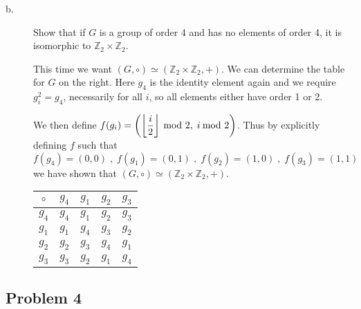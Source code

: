 \documentclass[../hw_sols.tex]{subfiles}
\begin{document}
\begin{description}
\begin{solution}
\end{solution}

\item[b.] Show that if $G$ is a group of order 4 and has no elements of order 
4, it is isomorphic to $\mathbb{Z}_2 \times \mathbb{Z}_2$.

\begin{solution}

This time we want $(G,\circ) \simeq (\mathbb{Z}_2 \times \mathbb{Z}_2, +)$. 
We can determine the table for $G$ on the right. Here $g_4$ is the identity 
element again and we require $g_i^2 = g_4$, necessarily for all $i$, so all 
elements either have order 1 or 2. 

\begin{minipage}{0.65\linewidth}
We then define 
$\displaystyle f(g_i) = 
\left( 
	\left\lfloor \frac{i}{2} \right\rfloor \tmod{2}, \; i \tmod{2} 
\right)$.
Thus by explicitly defining $f$ such that
	\[ f(g_4) = (0,0) \; , \; 
	f(g_1) = (0,1) \; , \; 
	f(g_2) = (1,0) \; , \; 
	f(g_3) = (1,1) \]
we have shown that $(G,\circ) \simeq (\mathbb{Z}_2 \times \mathbb{Z}_2, +)$.
\end{minipage}
\quad\quad
\begin{minipage}{0.25\linewidth}
\begin{tabular}{ c | c | c | c | c }
	$\circ$ & $g_4$ & $g_1$ & $g_2$ & $g_3$ \\
	\hline
	  $g_4$ & $g_4$ & $g_1$ & $g_2$ & $g_3$ \\
	\hline
	  $g_1$ & $g_1$ & $g_4$ & $g_3$ & $g_2$ \\
	\hline
	  $g_2$ & $g_2$ & $g_3$ & $g_4$ & $g_1$ \\
	\hline
	  $g_3$ & $g_3$ & $g_2$ & $g_1$ & $g_4$
\end{tabular}
\end{minipage}

\end{solution}

\end{description}


\newpage



\subsection*{Problem 4}
\end{document}
